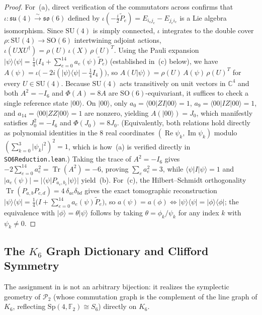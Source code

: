 \documentclass[11pt,a4paper]{article}
\theoremstyle{plain}
\theoremstyle{definition}
\theoremstyle{remark}
\newcommand{\C}{\mathbb{C}}
\newcommand{\F}{\mathbb{F}}
\newcommand{\ket}[1]{\lvert #1 \rangle}
\newcommand{\ketbra}[2]{\lvert #1 \rangle\langle #2 \rvert}
\newcommand{\expval}[2]{\langle #1 \vert #2 \vert #1 \rangle}
\newcommand{\Tr}{\operatorname{Tr}}
\newcommand{\SO}{\mathrm{SO}}
\newcommand{\SU}{\mathrm{SU}}
\newcommand{\Sp}{\mathrm{Sp}}
\newcommand{\Pauli}{\mathcal{P}}
\newcommand{\code}[1]{\texttt{\small #1}}
\begin{document}
\begin{proof}
For~(a), direct verification of the commutators across  confirms that $\iota : \mathfrak{su}(4) \xrightarrow{\sim} \mathfrak{so}(6)$ defined by $\iota\!\left(-\frac{i}{2}\tilde{P}_e\right) = E_{i_e j_e} - E_{j_e i_e}$ is a Lie algebra isomorphism. Since $\SU(4)$ is simply connected, $\iota$ integrates to the double cover $\rho : \SU(4) \to \SO(6)$ intertwining adjoint actions, $\iota(U X U^\dagger) = \rho(U)\,\iota(X)\,\rho(U)^T$. Using the Pauli expansion $\ketbra{\psi}{\psi} = \frac{1}{4}\bigl(I_4 + \sum_{e=0}^{14} a_e(\psi)\tilde{P}_e\bigr)$ (established in~(c) below), we have $A(\psi) = \iota\bigl(-2i(\ketbra{\psi}{\psi} - \frac{1}{4}I_4)\bigr)$, so $A(U\ket{\psi}) = \rho(U)\,A(\psi)\,\rho(U)^T$ for every $U \in \SU(4)$. Because $\SU(4)$ acts transitively on unit vectors in $\C^4$ and both $A^2 = -I_6$ and $\Phi(A) = 8A$ are $\SO(6)$-equivariant, it suffices to check a single reference state $\ket{00}$. On $\ket{00}$, only $a_0 = \expval{00}{ZI} = 1$, $a_9 = \expval{00}{IZ} = 1$, and $a_{14} = \expval{00}{ZZ} = 1$ are nonzero, yielding $A(\ket{00}) = J_0$, which manifestly satisfies $J_0^2 = -I_6$ and $\Phi(J_0) = 8J_0$. (Equivalently, both relations hold directly as polynomial identities in the $8$ real coordinates $(\operatorname{Re}\psi_k, \operatorname{Im}\psi_k)$ modulo $(\sum_{k=0}^3 \lvert\psi_k\rvert^2)^2 = 1$, which is how~(a) is verified directly in \code{SO6Reduction.lean}.) Taking the trace of $A^2 = -I_6$ gives $-2\sum_{e=0}^{14} a_e^2 = \Tr(A^2) = -6$, proving $\sum_e a_e^2 = 3$, while $\expval{\psi}{I} = 1$ and $\lvert a_e(\psi)\rvert = \lvert\expval{\psi}{P_{a_e,b_e}}\rvert$ yield~(b). For~(c), the Hilbert--Schmidt orthogonality $\Tr(P_{a,b} P_{c,d}) = 4\,\delta_{ac}\delta_{bd}$ gives the exact tomographic reconstruction $\ketbra{\psi}{\psi} = \frac{1}{4}\bigl(I + \sum_{e=0}^{14} a_e(\psi)\tilde{P}_e\bigr)$, so $a(\psi) = a(\phi) \iff \ketbra{\psi}{\psi} = \ketbra{\phi}{\phi}$; the equivalence with $\ket{\phi} = \theta\ket{\psi}$ follows by taking $\theta = \phi_k/\psi_k$ for any index $k$ with $\psi_k \neq 0$.
\end{proof}

\subsection{The \texorpdfstring{$K_6$}{K6} Graph Dictionary and Clifford Symmetry}

The assignment in  is not an arbitrary bijection: it realizes the symplectic geometry of $\Pauli_2$ (whose commutation graph is the complement of the line graph of $K_6$, reflecting $\Sp(4,\F_2) \cong S_6$) directly on $K_6$.
\end{document}
